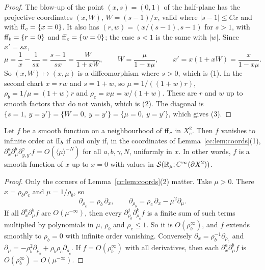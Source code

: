 \begin{proof}
The blow-up of the point \((x,s)=(0,1)\) of the half-plane has the
projective coordinates \((x,W)\), \(W=(s-1)/x\), valid where
\(|s-1|\le Cx\) and with \(\mathrm{ff}_c=\{x=0\}\). It also has
\((r,w)=(x/(s-1),s-1)\) for \(s>1\), with \(\mathrm{ff}_b=\{r=0\}\) and
\(\mathrm{ff}_c=\{w=0\}\); the case \(s<1\) is the same with \(|w|\). Since
\(x'=sx\),
\[
 \mu=\frac1x-\frac1{sx}=\frac{s-1}{sx}=\frac{W}{1+xW},\qquad
 W=\frac{\mu}{1-x\mu},\qquad x'=x(1+xW)=\frac{x}{1-x\mu} .
\]
So \((x,W)\mapsto(x,\mu)\) is a diffeomorphism where \(s>0\), which is (1).
In the second chart \(x=rw\) and \(s=1+w\), so
\(\mu=1/((1+w)r)\), \(\rho_b=1/\mu=(1+w)r\) and \(\rho_c=x\mu=w/(1+w)\).
These are \(r\) and \(w\) up to smooth factors that do not vanish, which
is (2). The diagonal is \(\{s=1,\ y=y'\}=\{W=0,\ y=y'\}=\{\mu=0,\ y=y'\}\),
which gives (3).
\end{proof}

\begin{lemma}
\label{cc:lem:decay}
Let \(f\) be a smooth function on a neighbourhood of \(\mathrm{ff}_c\) in \(X_c^2\).
Then \(f\) vanishes to infinite order at \(\mathrm{ff}_b\) if and only if, in the
coordinates of Lemma~\ref{cc:lem:coords}(1),
\(\partial_x^a\partial_\mu^b\partial_{y,y'}^\gamma f=
O(\langle\mu\rangle^{-N})\) for all \(a,b,\gamma,N\), uniformly in
\(x\). In other words, \(f\) is a smooth function of \(x\) up to \(x=0\)
with values in \(\mathcal S(\mathbb R_\mu;C^\infty(\partial X^2))\).
\end{lemma}

\begin{proof}
Only the corners of Lemma~\ref{cc:lem:coords}(2) matter. Take
\(\mu>0\). There \(x=\rho_b\rho_c\) and \(\mu=1/\rho_b\), so
\[
 \partial_{\rho_c}=\rho_b\,\partial_x,\qquad
 \partial_{\rho_b}=\rho_c\,\partial_x-\mu^2\partial_\mu .
\]
If all \(\partial_x^a\partial_\mu^bf\) are \(O(\mu^{-\infty})\), then every
\(\partial_{\rho_b}^j\partial_{\rho_c}^kf\) is a finite sum of such terms
multiplied by polynomials in \(\mu\), \(\rho_b\) and \(\rho_c\le1\). So
it is \(O(\rho_b^\infty)\), and \(f\) extends smoothly to
\(\rho_b=0\) with infinite order vanishing. Conversely
\(\partial_x=\rho_b^{-1}\partial_{\rho_c}\) and
\(\partial_\mu=-\rho_b^2\partial_{\rho_b}+\rho_b\rho_c\partial_{\rho_c}\).
If \(f=O(\rho_b^\infty)\) with all derivatives, then each
\(\partial_x^a\partial_\mu^bf\) is \(O(\rho_b^\infty)=O(\mu^{-\infty})\).
\end{proof}

